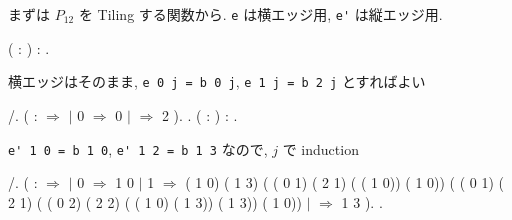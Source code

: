 \documentclass[12pt]{report}
\begin{document}
 
まずは $P_{12}$ を Tiling する関数から. \verb|e| は横エッジ用, \verb|e'| は縦エッジ用.
  \begin{coqdoccode}
\coqdocemptyline
\coqdocnoindent
{}  ( : ) : .\coqdoceol
\end{coqdoccode}
 横エッジはそのまま, \verb|e 0 j = b 0 j|, \verb|e 1 j = b 2 j| とすればよい  \begin{coqdoccode}
\coqdocemptyline
\coqdocnoindent
{} /.\coqdoceol
\coqdocnoindent
{} (   :  \ensuremath{\Rightarrow}\coqdoceol
\coqdocnoindent
{}  \coqdoceol
\coqdocindent{1.00em}
\ensuremath{|} 0 \ensuremath{\Rightarrow}  0 \coqdoceol
\coqdocindent{1.00em}
\ensuremath{|} \coqdocvar{\_} \ensuremath{\Rightarrow}  2 \coqdoceol
\coqdocnoindent
{}).\coqdoceol
\coqdocnoindent
{}.\coqdoceol
\coqdocemptyline
\coqdocnoindent
{}  ( : ) : .\coqdoceol
\end{coqdoccode}
 \verb|e' 1 0 = b 1 0|, \verb|e' 1 2 = b 1 3| なので, $j$ で induction  \begin{coqdoccode}
\coqdocemptyline
\coqdocnoindent
{} /.\coqdoceol
\coqdocnoindent
{} (   :  \ensuremath{\Rightarrow}\coqdoceol
\coqdocnoindent
{}  \coqdoceol
\coqdocindent{1.00em}
\ensuremath{|} 0 \ensuremath{\Rightarrow}  1 0\coqdoceol
\coqdocindent{1.00em}
\ensuremath{|} 1 \ensuremath{\Rightarrow}  ( 1 0) ( 1 3)\coqdoceol
\coqdocindent{5.00em}
( ( 0 1) ( 2 1) ( ( 1 0)) ( 1 0))\coqdoceol
\coqdocindent{5.00em}
( ( 0 1) ( 2 1)\coqdoceol
\coqdocindent{5.50em}
( ( 0 2) ( 2 2) ( ( 1 0) ( 1 3)) ( 1 3))\coqdoceol
\coqdocindent{5.50em}
( 1 0))\coqdoceol
\coqdocindent{1.00em}
\ensuremath{|} \coqdocvar{\_} \ensuremath{\Rightarrow}  1 3\coqdoceol
\coqdocnoindent
{}).\coqdoceol
\coqdocnoindent
{}.\coqdoceol
\coqdocemptyline
\end{coqdoccode}
\end{document}
